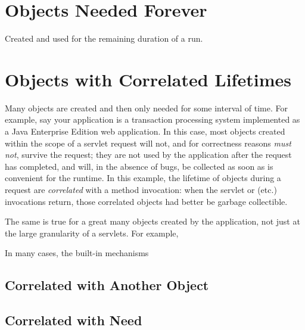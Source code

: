 




\section{Objects Needed Forever}
\label{forever-lifetime}

Created and used for the remaining duration of a run.


\section{Objects with Correlated Lifetimes}

Many objects are created and then only needed for some interval of time. For
example, say your application is a transaction processing system implemented as
a Java Enterprise Edition web application. In this case, most objects
created within the scope of a servlet request will not, and for correctness
reasons {\em must not}, survive the request; they are not used by the 
application after the request has completed, and will, in the absence of bugs,
be collected as soon as is convenient for the runtime. In this example, the
lifetime of objects during a request are {\em correlated} with a method
invocation: when the servlet  or  (etc.) invocations
return, those correlated objects had better be garbage collectible.

The same is true for a great many objects created by the application, not just
at the large granularity of a servlets. For example,

In many cases, the built-in mechanisms 

\subsection{Correlated with Another Object}
\label{correlated-lifetime-1}

\subsection{Correlated with Need}
\label{correlated-lifetime-2}

